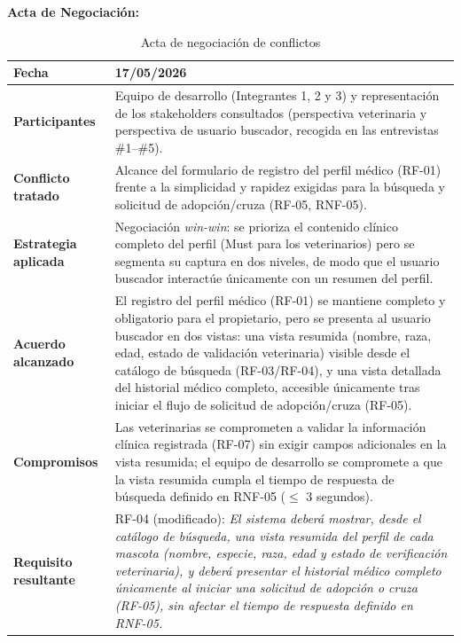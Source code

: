 \documentclass[journal,onecolumn]{IEEEtran}
\begin{document}
\textbf{Acta de Negociación:}
\begin{table}[H]
\caption{Acta de negociación de conflictos}
\label{tab:acta_neg}
\begin{tabularx}{\textwidth}{|l|X|}
\hline
\textbf{Fecha} & 17/05/2026 \\
\hline
\textbf{Participantes} & Equipo de desarrollo (Integrantes 1, 2 y 3) y
representación de los stakeholders consultados (perspectiva veterinaria y
perspectiva de usuario buscador, recogida en las entrevistas \#1--\#5). \\
\hline
\textbf{Conflicto tratado} & Alcance del formulario de registro del perfil
médico (RF-01) frente a la simplicidad y rapidez exigidas para la búsqueda
y solicitud de adopción/cruza (RF-05, RNF-05). \\
\hline
\textbf{Estrategia aplicada} & Negociación \textit{win-win}: se prioriza el
contenido clínico completo del perfil (Must para los veterinarios) pero se
segmenta su captura en dos niveles, de modo que el usuario buscador
interactúe únicamente con un resumen del perfil. \\
\hline
\textbf{Acuerdo alcanzado} & El registro del perfil médico (RF-01) se
mantiene completo y obligatorio para el propietario, pero se presenta al
usuario buscador en dos vistas: una vista resumida (nombre, raza, edad,
estado de validación veterinaria) visible desde el catálogo de búsqueda
(RF-03/RF-04), y una vista detallada del historial médico completo,
accesible únicamente tras iniciar el flujo de solicitud de adopción/cruza
(RF-05). \\
\hline
\textbf{Compromisos} & Las veterinarias se comprometen a validar la
información clínica registrada (RF-07) sin exigir campos adicionales en la
vista resumida; el equipo de desarrollo se compromete a que la vista
resumida cumpla el tiempo de respuesta de búsqueda definido en RNF-05
($\leq$ 3 segundos). \\
\hline
\textbf{Requisito resultante} & RF-04 (modificado): \textit{El sistema
deberá mostrar, desde el catálogo de búsqueda, una vista resumida del
perfil de cada mascota (nombre, especie, raza, edad y estado de
verificación veterinaria), y deberá presentar el historial médico completo
únicamente al iniciar una solicitud de adopción o cruza (RF-05), sin
afectar el tiempo de respuesta definido en RNF-05.} \\
\hline
\end{tabularx}
\end{table}

\newpage
\end{document}
